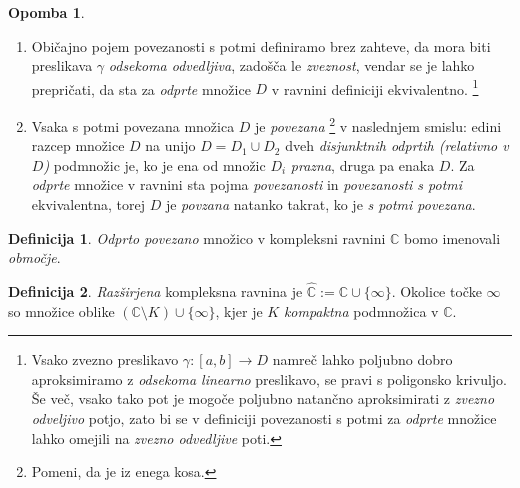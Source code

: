 \documentclass[11pt]{article}
\theoremstyle{definition}
\newtheorem{definicija}{Definicija}[section]
\theoremstyle{definition}
\theoremstyle{definition}
\newtheorem*{opomba}{Opomba}
\begin{document}
\begin{opomba}
~
\begin{enumerate}

	\item Običajno pojem povezanosti s potmi definiramo brez zahteve, da mora biti preslikava $\gamma$ \textit{odsekoma odvedljiva}, zadošča le \textit{zveznost}, vendar se je lahko prepričati, da sta za \textit{odprte} množice $D$ v ravnini definiciji ekvivalentno. \footnote{Vsako zvezno preslikavo $\gamma: [a, b] \rightarrow D$ namreč lahko poljubno dobro aproksimiramo z \textit{odsekoma linearno} preslikavo, se pravi s poligonsko krivuljo. Še več, vsako tako pot je mogoče poljubno natančno aproksimirati z \textit{zvezno odveljivo} potjo, zato bi se v definiciji povezanosti s potmi za \textit{odprte} množice lahko omejili na \textit{zvezno odvedljive} poti.}
	
	\item Vsaka s potmi povezana množica $D$ je \textit{povezana} \footnote{Pomeni, da je iz enega kosa.} v naslednjem smislu: edini razcep množice $D$ na unijo $D = D_1 \cup D_2$ dveh \textit{disjunktnih odprtih (relativno v $D$)} podmnožic je, ko je ena od množic $D_i$ \textit{prazna}, druga pa enaka $D$. Za \textit{odprte} množice v ravnini sta pojma \textit{povezanosti} in \textit{povezanosti s potmi} ekvivalentna, torej $D$ je \textit{povzana} natanko takrat, ko je \textit{s potmi povezana}. 
	
\end{enumerate}

\end{opomba}
\vspace{0.5cm}

\begin{definicija}

\textit{Odprto povezano} množico v kompleksni ravnini $\mathbb{C}$ bomo imenovali \textit{območje}.

\end{definicija}
\vspace{0.5cm}

\begin{definicija}

\textit{Razširjena} kompleksna ravnina je $\hat{\mathbb{C}} := \mathbb{C} \cup \{\infty\}.$ Okolice točke $\infty$ so množice oblike $(\mathbb{C} \setminus K) \cup \{\infty\}$, kjer je $K$ \textit{kompaktna} podmnožica v $\mathbb{C}$.

\end{definicija}
\vspace{0.5cm}
\end{document}
